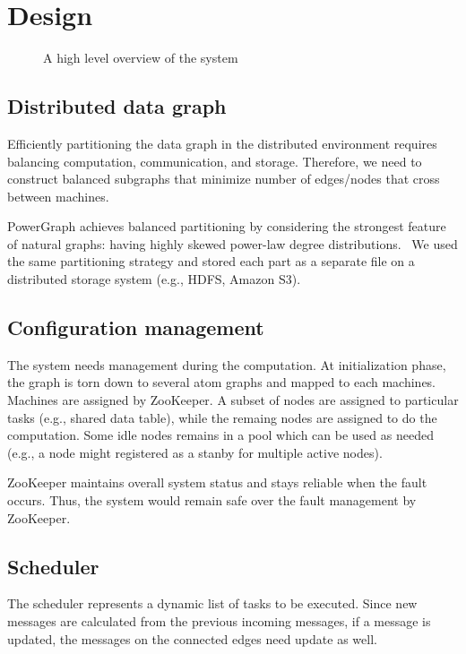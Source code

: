 
\section{Design}

\begin{figure*}
\centering
\caption{A high level overview of the system}
\label{fig:cdn}
\end{figure*}

\subsection{Distributed data graph}
Efficiently partitioning the data graph in the distributed environment requires balancing computation, communication, and storage. 
Therefore, we need to construct balanced subgraphs that minimize number of edges/nodes that cross between machines. 

PowerGraph achieves balanced partitioning by considering the strongest feature of natural graphs: having highly skewed power-law degree distributions.~\cite{powerGraph} 
We used the same partitioning strategy and stored each part as a separate file on a distributed storage system (e.g., HDFS, Amazon S3).

\subsection{Configuration management}
The system needs management during the computation. 
At initialization phase, the graph is torn down to several atom graphs and mapped to each machines. 
Machines are assigned by ZooKeeper. A subset of nodes are assigned to particular tasks (e.g., shared data table), while the remaing nodes are assigned to do the computation. 
Some idle nodes remains in a pool which can be used as needed (e.g., a node might registered as a stanby for multiple active nodes). 

ZooKeeper maintains overall system status and stays reliable when the fault occurs. Thus, the system would remain safe over the fault management by ZooKeeper.

\subsection{Scheduler}
The scheduler represents a dynamic list of tasks to be executed. Since new messages are calculated from the previous incoming messages, if a message is updated, the messages on the connected edges need update as well. 

